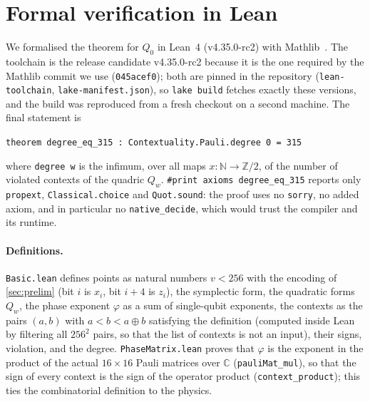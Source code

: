 \documentclass[11pt]{article}
\theoremstyle{definition}
\theoremstyle{remark}
\begin{document}
\section{Formal verification in Lean}\label{sec:lean}
We formalised the theorem for $Q_0$ in Lean~4 (v4.35.0-rc2) with Mathlib~\cite{Lean4,Mathlib}.
The toolchain is the release candidate v4.35.0-rc2 because it is the one required by the Mathlib commit we use (\texttt{045acef0}); both are pinned in the repository (\texttt{lean-toolchain}, \texttt{lake-manifest.json}), so \texttt{lake build} fetches exactly these versions, and the build was reproduced from a fresh checkout on a second machine.
The final statement is
\begin{center}
\texttt{theorem degree\_eq\_315 : Contextuality.Pauli.degree 0 = 315}
\end{center}
where \texttt{degree w} is the infimum, over all maps $x:\mathbb N\to\mathbb Z/2$, of the number of violated contexts of the quadric $Q_w$.
\texttt{\#print axioms degree\_eq\_315} reports only \texttt{propext}, \texttt{Classical.choice} and \texttt{Quot.sound}: the proof uses no \texttt{sorry}, no added axiom, and in particular no \texttt{native\_decide}, which would trust the compiler and its runtime.

\paragraph{Definitions.}
\texttt{Basic.lean} defines points as natural numbers $v<256$ with the encoding of \cref{sec:prelim} (bit $i$ is $x_i$, bit $i+4$ is $z_i$), the symplectic form, the quadratic forms $Q_w$, the phase exponent $\varphi$ as a sum of single-qubit exponents, the contexts as the pairs $(a,b)$ with $a<b<a\oplus b$ satisfying the definition (computed inside Lean by filtering all $256^2$ pairs, so that the list of contexts is not an input), their signs, violation, and the degree.
\texttt{PhaseMatrix.lean} proves that $\varphi$ is the exponent in the product of the actual $16\times16$ Pauli matrices over $\mathbb C$ (\texttt{pauliMat\_mul}), so that the sign of every context is the sign of the operator product (\texttt{context\_product}); this ties the combinatorial definition to the physics.
\end{document}
